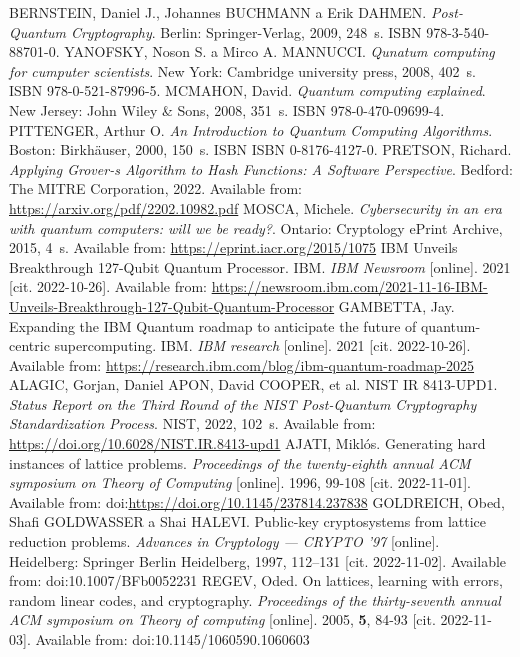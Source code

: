 \begin{thebibliography}{99}
  BERNSTEIN, Daniel J., Johannes BUCHMANN a Erik DAHMEN. \textit{Post-Quantum Cryptography}. Berlin: Springer-Verlag, 2009, 248~s. ISBN 978-3-540-88701-0.
  YANOFSKY, Noson S. a Mirco A. MANNUCCI. \textit{Qunatum computing for cumputer scientists}. New York: Cambridge university press, 2008, 402~s. ISBN 978-0-521-87996-5.
  MCMAHON, David. \textit{Quantum computing explained}. New Jersey: John Wiley \& Sons, 2008, 351~s. ISBN 978-0-470-09699-4. 
  PITTENGER, Arthur O. \textit{An Introduction to Quantum Computing Algorithms}. Boston: Birkhäuser, 2000, 150~s. ISBN ISBN 0-8176-4127-0.
  PRETSON, Richard. \textit{Applying Grover-s Algorithm to Hash Functions: A Software Perspective}. Bedford: The MITRE Corporation, 2022. Available from: \url{https://arxiv.org/pdf/2202.10982.pdf}
  MOSCA, Michele. \textit{Cybersecurity in an era with quantum computers: will we be ready?}. Ontario: Cryptology ePrint Archive, 2015, 4~s. Available from: \url{https://eprint.iacr.org/2015/1075}
  IBM Unveils Breakthrough 127-Qubit Quantum Processor. IBM. \textit{IBM Newsroom} [online]. 2021 [cit. 2022-10-26]. Available from: \url{https://newsroom.ibm.com/2021-11-16-IBM-Unveils-Breakthrough-127-Qubit-Quantum-Processor}
  GAMBETTA, Jay. Expanding the IBM Quantum roadmap to anticipate the future of quantum-centric supercomputing. IBM. \textit{IBM research} [online]. 2021 [cit. 2022-10-26]. Available from: \url{https://research.ibm.com/blog/ibm-quantum-roadmap-2025}
  ALAGIC, Gorjan, Daniel APON, David COOPER, et al. NIST IR 8413-UPD1. \textit{Status Report on the Third Round of the NIST Post-Quantum Cryptography Standardization Process}. NIST, 2022, 102~s. Available from: \url{https://doi.org/10.6028/NIST.IR.8413-upd1}
  AJATI, Miklós. Generating hard instances of lattice problems. \textit{Proceedings of the twenty-eighth annual ACM symposium on Theory of Computing} [online]. 1996, 99-108 [cit. 2022-11-01]. Available from: doi:\url{https://doi.org/10.1145/237814.237838}
  GOLDREICH, Obed, Shafi GOLDWASSER a Shai HALEVI. Public-key cryptosystems from lattice reduction problems. \textit{Advances in Cryptology --- CRYPTO '97} [online]. Heidelberg: Springer Berlin Heidelberg, 1997, 112--131 [cit. 2022-11-02]. Available from: doi:10.1007/BFb0052231
  REGEV, Oded. On lattices, learning with errors, random linear codes, and cryptography. \textit{Proceedings of the thirty-seventh annual ACM symposium on Theory of computing} [online]. 2005, \textbf{5}, 84-93 [cit. 2022-11-03]. Available from: doi:10.1145/1060590.1060603

\end{thebibliography}
